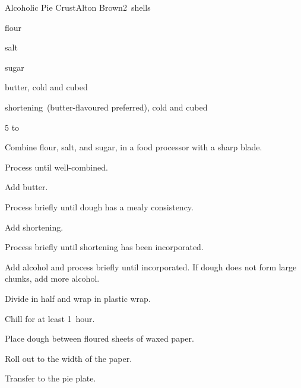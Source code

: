 \begin{recipe}{Alcoholic Pie Crust}{Alton Brown}{2~shells}

\begin{ingredients}
\item {} flour
\item {} salt
\item {} sugar
\item {} butter, cold and cubed
\item {} shortening~(butter-flavoured preferred), cold and cubed
\item 5 to  
\end{ingredients}

\begin{directions}
\item Combine flour, salt, and sugar, in a food processor with a sharp blade.
\item Process until well-combined.
\item Add butter.
\item Process briefly until dough has a mealy consistency.
\item Add shortening.
\item Process briefly until shortening has been incorporated.
\item Add  alcohol and process briefly until incorporated. If dough does not form large chunks, add more alcohol.
\item Divide in half and wrap in plastic wrap.
\item Chill for at least 1~hour.
\item Place dough between floured sheets of waxed paper.
\item Roll out to the width of the paper.
\item Transfer to the pie plate.
\end{directions}

\end{recipe}
